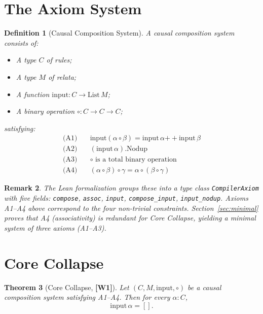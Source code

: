 ﻿\documentclass[11pt]{article}
\newcommand{\wone}[1]{\textcolor{wcolor}{\textbf{[#1]}}}
\newtheorem{theorem}{Theorem}
\newtheorem{definition}[theorem]{Definition}
\newtheorem{remark}[theorem]{Remark}
\begin{document}
\section{The Axiom System}
\label{sec:axioms}

\begin{definition}[Causal Composition System]
\label{def:system}
A \emph{causal composition system} consists of:
\begin{itemize}
\item A type $C$ of \emph{rules};
\item A type $M$ of \emph{relata};
\item A function $\mathrm{input} : C \to \mathrm{List}\,M$;
\item A binary operation $\circ : C \to C \to C$;
\end{itemize}
satisfying:
\begin{align}
\text{(A1)}\quad & \mathrm{input}(\alpha \circ \beta)
  = \mathrm{input}\,\alpha \mathbin{+\!+}
    \mathrm{input}\,\beta
  \label{ax:additive}\\
\text{(A2)}\quad & (\mathrm{input}\,\alpha).\mathrm{Nodup}
  \label{ax:nodup}\\
\text{(A3)}\quad & \circ \text{ is a total binary operation}
  \label{ax:compose}\\
\text{(A4)}\quad & (\alpha \circ \beta) \circ \gamma
  = \alpha \circ (\beta \circ \gamma)
  \label{ax:assoc}
\end{align}
\end{definition}

\begin{remark}
The Lean formalization groups these into a type class
\texttt{CompilerAxiom} with five fields:
\texttt{compose}, \texttt{assoc}, \texttt{input},
\texttt{compose\_input}, \texttt{input\_nodup}.
Axioms A1--A4 above correspond to the four non-trivial
constraints. Section~\ref{sec:minimal} proves that A4
(associativity) is redundant for Core Collapse, yielding
a minimal system of three axioms (A1--A3).
\end{remark}

\section{Core Collapse}
\label{sec:core}

\begin{theorem}[Core Collapse, \wone{W1}]
\label{thm:core}
Let $(C, M, \mathrm{input}, \circ)$ be a causal composition
system satisfying A1--A4. Then for every $\alpha : C$,
\[
\mathrm{input}\,\alpha = [].
\]
\end{theorem}
\end{document}
